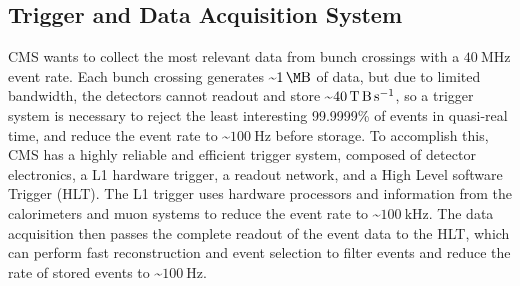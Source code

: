 \subsection{Trigger and Data Acquisition System}
CMS wants to collect the most relevant data from bunch crossings with a $\SI{40}{\MHz}$ event rate.
Each bunch crossing generates \sim$\SI{1}{\M \byte}$ of data, but due to limited bandwidth, the detectors cannot readout and store \sim$\SI{40}{\T \byte \per \s}$, so a trigger system is necessary to reject the least interesting 99.9999\% of events in quasi-real time, and reduce the event rate to \sim$\SI{100}{\Hz}$ before storage.
To accomplish this, CMS has a highly reliable and efficient trigger system, composed of detector electronics, a L1 hardware trigger, a readout network, and a High Level software Trigger (HLT).
The L1 trigger uses hardware processors and information from the calorimeters and muon systems to reduce the event rate to \sim$\SI{100}{\kHz}$.
The data acquisition then passes the complete readout of the event data to the HLT, which can perform fast reconstruction and event selection to filter events and reduce the rate of stored events to \sim$\SI{100}{\Hz}$.



